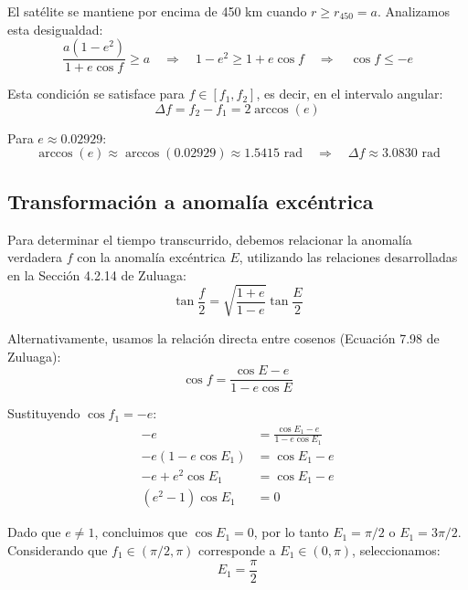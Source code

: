 \documentclass[12pt, a4paper]{article}
\begin{document}
El satélite se mantiene por encima de 450 km cuando $r \geq r_{450} = a$. Analizamos esta desigualdad:
\begin{equation}
    \frac{a(1-e^2)}{1 + e\cos f} \geq a \quad \Rightarrow \quad 1 - e^2 \geq 1 + e\cos f \quad \Rightarrow \quad \cos f \leq -e
\end{equation}

Esta condición se satisface para $f \in [f_1, f_2]$, es decir, en el intervalo angular:
\begin{equation}
    \Delta f = f_2 - f_1 = 2\arccos(e)
\end{equation}

Para $e \approx 0.02929$:
\begin{equation}
    \arccos(e) \approx \arccos(0.02929) \approx 1.5415 \text{ rad} \quad \Rightarrow \quad \Delta f \approx 3.0830 \text{ rad}
\end{equation}

\subsection*{Transformación a anomalía excéntrica}

Para determinar el tiempo transcurrido, debemos relacionar la anomalía verdadera $f$ con la anomalía excéntrica $E$, utilizando las relaciones desarrolladas en la Sección 4.2.14 de Zuluaga:
\begin{equation}
    \tan\frac{f}{2} = \sqrt{\frac{1+e}{1-e}}\tan\frac{E}{2}
\end{equation}

Alternativamente, usamos la relación directa entre cosenos (Ecuación 7.98 de Zuluaga):
\begin{equation}
    \cos f = \frac{\cos E - e}{1 - e\cos E}
\end{equation}

Sustituyendo $\cos f_1 = -e$:
\begin{align}
    -e &= \frac{\cos E_1 - e}{1 - e\cos E_1} \\
    -e(1 - e\cos E_1) &= \cos E_1 - e \\
    -e + e^2\cos E_1 &= \cos E_1 - e \\
    (e^2 - 1)\cos E_1 &= 0
\end{align}

Dado que $e \neq 1$, concluimos que $\cos E_1 = 0$, por lo tanto $E_1 = \pi/2$ o $E_1 = 3\pi/2$. Considerando que $f_1 \in (\pi/2, \pi)$ corresponde a $E_1 \in (0, \pi)$, seleccionamos:
\begin{equation}
    E_1 = \frac{\pi}{2}
\end{equation}
\end{document}
